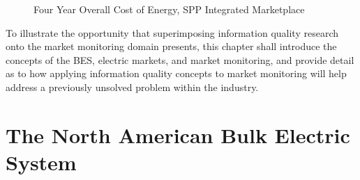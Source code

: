 \begin{figure}[h]
\centering
{}
\caption{Four Year Overall Cost of Energy, SPP Integrated Marketplace}
\label{fig:price-trend-line}
\end{figure}

To illustrate the opportunity that superimposing information quality research onto the market monitoring domain presents, this chapter shall introduce the concepts of the BES, electric markets, and market monitoring, and provide detail as to how applying information quality concepts to market monitoring will help address a previously unsolved problem within the industry.

\section{The North American Bulk Electric System}

